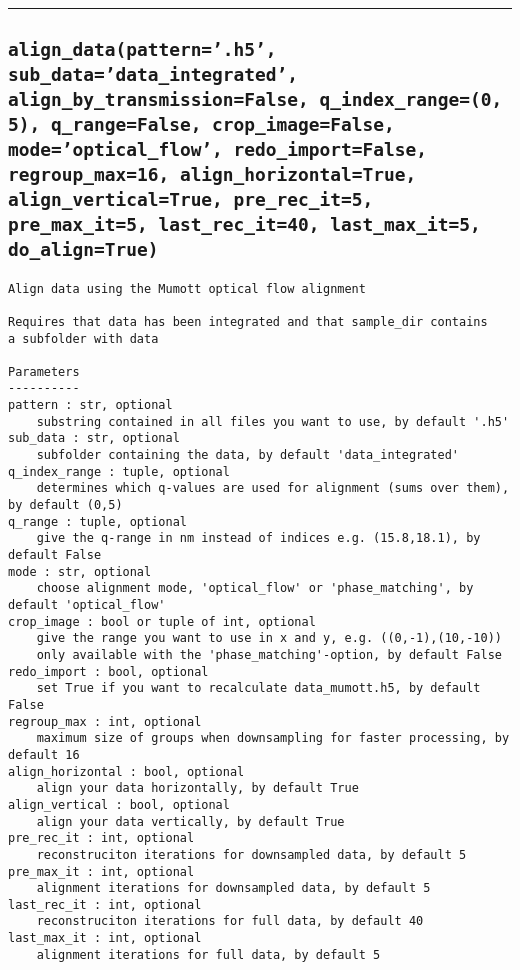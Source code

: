 \documentclass{article}
\begin{document}


\vspace{5mm}

\hrule

\subsection*{\texttt{align\_data(pattern='.h5', sub\_data='data\_integrated', align\_by\_transmission=False, q\_index\_range=(0, 5), q\_range=False, crop\_image=False, mode='optical\_flow', redo\_import=False, regroup\_max=16, align\_horizontal=True, align\_vertical=True, pre\_rec\_it=5, pre\_max\_it=5, last\_rec\_it=40, last\_max\_it=5, do\_align=True)}}
\label{fun:aligndata}

\begin{lstlisting}[language=docstring]
Align data using the Mumott optical flow alignment

Requires that data has been integrated and that sample_dir contains
a subfolder with data

Parameters
----------
pattern : str, optional
    substring contained in all files you want to use, by default '.h5'
sub_data : str, optional
    subfolder containing the data, by default 'data_integrated'
q_index_range : tuple, optional
    determines which q-values are used for alignment (sums over them), by default (0,5)
q_range : tuple, optional
    give the q-range in nm instead of indices e.g. (15.8,18.1), by default False
mode : str, optional
    choose alignment mode, 'optical_flow' or 'phase_matching', by default 'optical_flow'
crop_image : bool or tuple of int, optional
    give the range you want to use in x and y, e.g. ((0,-1),(10,-10))
    only available with the 'phase_matching'-option, by default False
redo_import : bool, optional
    set True if you want to recalculate data_mumott.h5, by default False
regroup_max : int, optional
    maximum size of groups when downsampling for faster processing, by default 16
align_horizontal : bool, optional
    align your data horizontally, by default True
align_vertical : bool, optional
    align your data vertically, by default True
pre_rec_it : int, optional
    reconstruciton iterations for downsampled data, by default 5
pre_max_it : int, optional
    alignment iterations for downsampled data, by default 5
last_rec_it : int, optional
    reconstruciton iterations for full data, by default 40
last_max_it : int, optional
    alignment iterations for full data, by default 5
\end{lstlisting}
\end{document}
